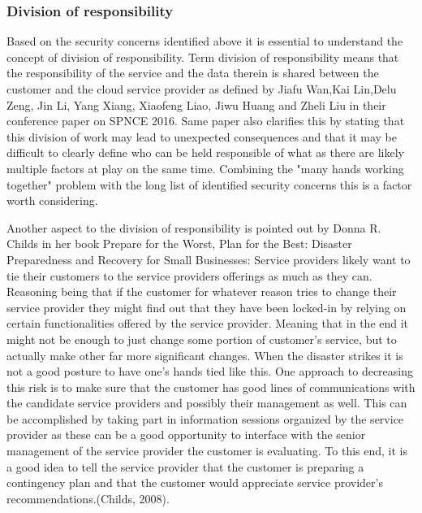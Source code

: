 \documentclass{article}
\begin{document}
\subsubsection{Division of responsibility}
Based on the security concerns identified above it is essential to understand the concept of division of responsibility.
Term division of responsibility means that the responsibility of the service and the data therein is shared between the customer and the cloud service provider as defined by Jiafu Wan,Kai Lin,Delu Zeng, Jin Li, Yang Xiang, Xiaofeng Liao, Jiwu Huang and Zheli Liu in their conference paper on SPNCE 2016.
Same paper also clarifies this by stating that this division of work may lead to unexpected consequences and that it may be difficult to clearly define who can be held responsible of what as there are likely multiple factors at play on the same time.
Combining the "many hands working together" problem with the long list of identified security concerns this is a factor worth considering.
\par
Another aspect to the division of responsibility is pointed out by Donna R. Childs in her book Prepare for the Worst, Plan for the Best: Disaster Preparedness and Recovery for Small Businesses: 
Service providers likely want to tie their customers to the service providers offerings as much as they can. Reasoning being that if the customer for whatever reason tries to change their service provider they might find out that they have been locked-in by relying on certain functionalities offered by the service provider. Meaning that in the end it might not be enough to just change some portion of customer's service, but to actually make other far more significant changes. When the disaster strikes it is not a good posture to have one's hands tied like this. One approach to decreasing this risk is to make sure that the customer has good lines of communications with the candidate service providers and possibly their management as well. This can be accomplished by taking part in information sessions organized by the service provider as these can be a good opportunity to interface with the senior management of the service provider the customer is evaluating. To this end, it is a good idea to tell the service provider that the customer is preparing a contingency plan and that the customer would appreciate service provider's recommendations.(Childs, 2008). 
\par
\end{document}

